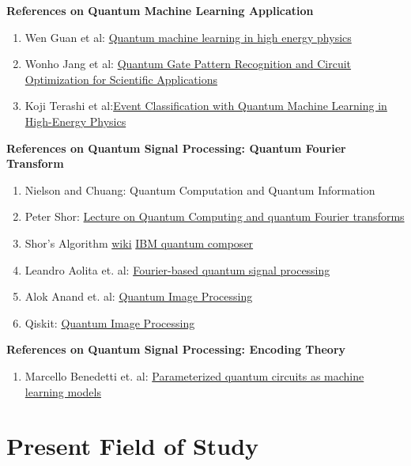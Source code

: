 \documentclass{article}
\begin{document}
\textbf{References on Quantum Machine Learning Application}
\begin{enumerate}
  \item Wen Guan et al: \href{https://iopscience.iop.org/article/10.1088/2632-2153/abc17d}{
    Quantum machine learning in high energy physics}
  \item Wonho Jang et al: \href{https://arxiv.org/abs/2102.10008}{
    Quantum Gate Pattern Recognition and Circuit Optimization for Scientific Applications}
  \item Koji Terashi et al:\href{https://link.springer.com/article/10.1007/s41781-020-00047-7}{Event Classification 
  with Quantum Machine Learning in High-Energy Physics }
\end{enumerate}

\textbf{References on Quantum Signal Processing: Quantum Fourier Transform}
\begin{enumerate}
  \item Nielson and Chuang: Quantum Computation and Quantum Information
  \item Peter Shor: \href{https://www.cl.cam.ac.uk/teaching/1920/QuantComp/Quantum_Computing_Lecture_9.pdf}{Lecture on Quantum Computing
  and quantum Fourier transforms}
  \item Shor's Algorithm \href{https://en.wikipedia.org/wiki/Shor%27s_algorithm}{wiki} \href{https://quantum-computing.ibm.com/composer/docs/iqx/guide/shors-algorithm}{IBM quantum composer} 
  \item Leandro Aolita et. al: \href{https://arxiv.org/abs/2206.02826}{Fourier-based quantum signal processing}
  \item Alok Anand et. al: \href{https://arxiv.org/pdf/2203.01831.pdf}{Quantum Image Processing }
  \item Qiskit: \href{https://qiskit.org/textbook/ch-applications/image-processing-frqi-neqr.html}{Quantum Image Processing}
\end{enumerate}

\textbf{References on Quantum Signal Processing: Encoding Theory }
\begin{enumerate}
  \item Marcello Benedetti et. al: \href{https://iopscience.iop.org/article/10.1088/2058-9565/ab4eb5}{Parameterized quantum circuits as machine learning models
  }
\end{enumerate}


\section{Present Field of Study}
\end{document}
